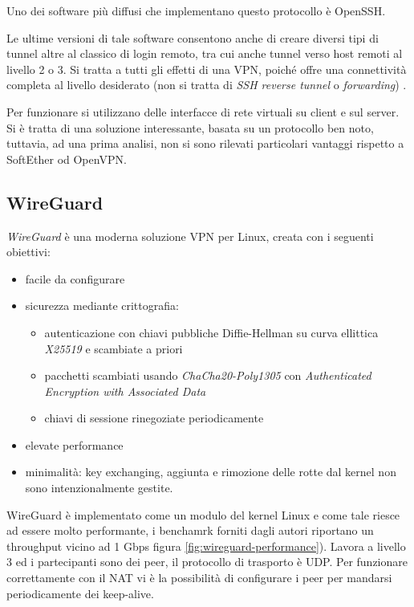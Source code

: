 Uno dei software più diffusi che implementano questo protocollo è OpenSSH.

Le ultime versioni di tale software consentono anche di creare
diversi tipi di tunnel altre al classico di login remoto, tra cui anche tunnel verso
host remoti al livello 2 o 3. Si tratta a tutti gli effetti di una VPN, poiché
offre una connettività completa al livello desiderato (non si tratta di
\textit{SSH reverse tunnel} o \textit{forwarding})
\cite{ssh-vpn-ubuntu} \cite{ssh-vpn-debian}.

Per funzionare si utilizzano delle interfacce di rete virtuali
su client e sul server. Si è tratta di una soluzione interessante, basata su un
protocollo ben noto, tuttavia, ad una prima analisi, non si sono rilevati
particolari vantaggi rispetto a SoftEther od OpenVPN.

\subsection{WireGuard}
\textit{WireGuard}\cite{DBLP:conf/ndss/Donenfield17} è una moderna soluzione VPN per Linux, creata con i seguenti obiettivi:
\begin{itemize}
	\item facile da configurare
	\item sicurezza mediante crittografia:
	      \begin{itemize}
	      	\item autenticazione con chiavi pubbliche Diffie-Hellman su curva ellittica \textit{X25519}
	      	      e scambiate a priori
	      	\item pacchetti scambiati usando \textit{ChaCha20-Poly1305} con \textit{Authenticated
	      		Encryption with Associated Data}
	      		\item chiavi di sessione rinegoziate periodicamente
	      	\end{itemize}
	      	\item elevate performance
	      	\item minimalità: key exchanging, aggiunta e rimozione delle rotte dal kernel
	      	      non sono intenzionalmente gestite.
	      \end{itemize}
	      WireGuard è implementato come un modulo del kernel Linux e come tale riesce ad essere
	      molto performante, i benchamrk forniti dagli autori riportano un throughput vicino
	      ad 1 Gbps figura \ref{fig:wireguard-performance}).
	      Lavora a livello 3 ed i partecipanti sono dei peer,
	      il protocollo di trasporto è UDP. Per funzionare correttamente con il NAT vi è
	      la possibilità di configurare i peer per mandarsi periodicamente dei keep-alive.
	      
